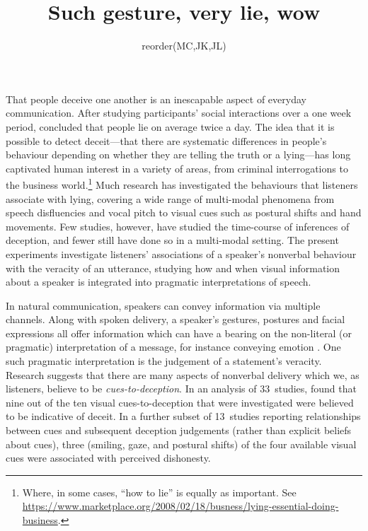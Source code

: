 \documentclass[a4paper,man,natbib]{apa6}
\title{Such gesture, very lie, wow}
\author{reorder(MC,JK,JL)}
\affiliation{Psychology, PPLS, University of Edinburgh}
\newcommand*{\term}[1]{\emph{#1}} %
\begin{document}

\maketitle
\linenumbers
\noindent
That people deceive one another is an inescapable aspect of everyday communication.
After studying participants' social interactions over a one week period, \citet{DePaulo1996} concluded that people lie on average twice a day.
The idea that it is possible to detect deceit---that there are systematic differences in people's behaviour depending on whether they are telling the truth or a lying---has long captivated human interest in a variety of areas, from criminal interrogations to the business world.\footnote{Where, in some cases, ``how to lie'' is equally as important. See \url{https://www.marketplace.org/2008/02/18/busness/lying-essential-doing-business}.}
Much research has investigated the behaviours that listeners associate with lying, covering a wide range of multi-modal phenomena from speech disfluencies and vocal pitch to visual cues such as postural shifts and hand movements.
Few studies, however, have studied the time-course of inferences of deception, and fewer still have done so in a multi-modal setting.
The present experiments investigate listeners' associations of a speaker's nonverbal behaviour with the veracity of an utterance, studying how and when visual information about a speaker is integrated into pragmatic interpretations of speech.

In natural communication, speakers can convey information via multiple channels.
Along with spoken delivery, a speaker's gestures, postures and facial expressions all offer information which can have a bearing on the non-literal (or pragmatic) interpretation of a message, for instance conveying emotion \citep{Busso2004, Gregersen2005}.
One such pragmatic interpretation is the judgement of a statement's veracity.
Research suggests that there are many aspects of nonverbal delivery which we, as listeners, believe to be \term{cues-to-deception}. 
In an analysis of 33~studies, \citet{Zuckerman1981} found that nine out of the ten visual cues-to-deception that were investigated were believed to be indicative of deceit. 
In a further subset of 13~studies reporting relationships between cues and subsequent deception judgements (rather than explicit beliefs about cues), three (smiling, gaze, and postural shifts) of the four available visual cues were associated with perceived dishonesty.
\end{document}
